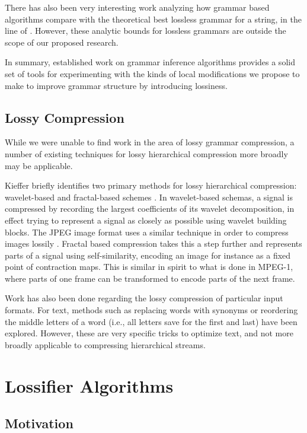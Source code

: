 \documentclass[11pt]{article}
\begin{document}
There has also been very interesting work analyzing how grammar based
algorithms compare with the theoretical best lossless grammar for a string, in
the line of \cite{approximation}.  However, these analytic bounds for lossless
grammars are outside the scope of our proposed research.

In summary, established work on grammar inference algorithms provides a solid
set of tools for experimenting with the kinds of local modifications we propose
to make to improve grammar structure by introducing lossiness.

\subsection{Lossy Compression}

While we were unable to find work in the area of lossy grammar compression, a
number of existing techniques for lossy hierarchical compression more broadly
may be applicable.

Kieffer briefly identifies two primary methods for lossy hierarchical
compression: wavelet-based and fractal-based schemes \cite{tutorial}.  In
wavelet-based schemas, a signal is compressed by recording the largest
coefficients of its wavelet decomposition, in effect
trying to represent a signal as closely as possible using wavelet
building blocks. The JPEG image format uses a similar technique in
order to compress images lossily \cite{jpeg}. Fractal based compression
takes this a step further and represents parts of a signal using self-similarity,
encoding an image for instance as a fixed point of contraction maps. This is
similar in spirit to what is done in MPEG-1, where parts of one frame can be
transformed to encode parts of the next frame.

Work has also been done regarding the lossy compression of particular input
formats.  For text, methods such as replacing words with synonyms
\cite{semanticlossy} or reordering the middle letters of a word (i.e., all
letters save for the first and last) \cite{semilossless} have been explored.
However, these are very specific tricks to optimize text, and not more broadly
applicable to compressing hierarchical streams.

\section{Lossifier Algorithms}

\subsection{Motivation}
\end{document}
